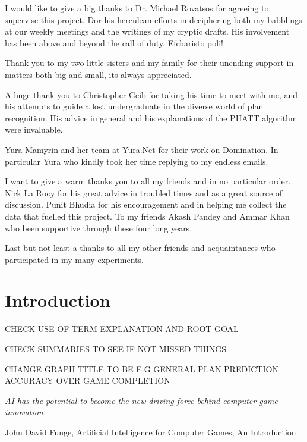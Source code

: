 \documentclass[parskip]{cs4rep}
\begin{document}
I would like to give a big thanks to Dr. Michael Rovatsos for agreeing to supervise this project. Dor his herculean efforts in deciphering both my babblings at our weekly meetings and the writings of my cryptic drafts. His involvement has been above and beyond the call of duty. Efcharisto poli!

Thank you to my two little sisters and my family for their unending support in matters both big and small, its always appreciated. 

A huge thank you to Christopher Geib for taking his time to meet with me, and his attempts to guide a lost undergraduate in the diverse world of plan recognition. His advice in general and his explanations of the PHATT algorithm were invaluable. 

Yura Mamyrin and her team at Yura.Net for their work on Domination. In particular Yura who kindly took her time replying to my endless emails.

I want to give a warm thanks you to all my friends and in no particular order. Nick La Rooy for his great advice in troubled times and as a great source of discussion. Punit Bhudia for his encouragement and in helping me collect the data that fuelled this project. To my friends Akash Pandey and Ammar Khan who been supportive through these four long years. 

Last but not least a thanks to all my other friends and acquaintances who participated in my many experiments.

\tableofcontents


\chapter{Introduction}

CHECK USE OF TERM EXPLANATION AND ROOT GOAL

CHECK SUMMARIES TO SEE IF NOT MISSED THINGS

CHANGE GRAPH TITLE TO BE E.G GENERAL PLAN PREDICTION ACCURACY OVER GAME COMPLETION

\begin{flushleft}
\textit{AI has the potential to become the new driving force behind computer game innovation.}
\end{flushleft}
\begin{flushleft}
John David Funge, Artificial Intelligence for Computer Games, An Introduction
\end{flushleft}
\end{document}
